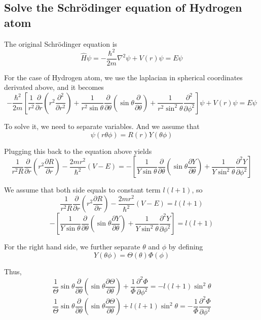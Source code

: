 \documentclass[letterpaper]{article}
\newcommand{\pd}[2]{\frac{\partial #1}{\partial #2}}
\newcommand{\pdd}[2]{\frac{\partial^2 #1}{\partial #2^2}}
\begin{document}
\subsection*{Solve the Schrödinger equation of Hydrogen atom}
The original Schrödinger equation is
\begin{equation*}
    \hat{H}\psi=-\frac{\hbar^2}{2m}\nabla^2\psi+V(r)\psi=E\psi
\end{equation*}

For the case of Hydrogen atom, we use the laplacian in spherical coordinates derivated
above, and it becomes
\begin{equation*}
    -\frac{\hbar^2}{2m}\left[\frac{1}{r^2}\pd{}{r}\left(r^2\pdd{}{r}\right)+
        \frac{1}{r^2\sin\theta}\pd{}{\theta}\left(\sin\theta\pd{}{\theta}\right)+
        \frac{1}{r^2\sin^2\theta}\pdd{}{\phi}\right]\psi+V(r)\psi=E\psi
\end{equation*}

To solve it, we need to separate variables. And we assume that
\begin{equation*}
    \psi(r\theta\phi)=R(r)Y(\theta\phi)
\end{equation*}

Plugging this back to the equation above yields
\begin{equation*}
    \frac{1}{r^2R}\pd{}{r}\left(r^2\pd{R}{r}\right)-\frac{2mr^2}{\hbar^2}(V-E)=
    -\left[\frac{1}{Y\sin\theta}\pd{}{\theta}\left(\sin\theta\pd{Y}{\theta}\right)+
        \frac{1}{Y\sin^2\theta}\pdd{Y}{\phi}\right]
\end{equation*}

We assume that both side equals to constant term $l(l+1)$, so
\begin{equation*}
    \boxed{\frac{1}{r^2R}\pd{}{r}\left(r^2\pd{R}{r}\right)-\frac{2mr^2}{\hbar^2}(V-E)=l(l+1)}
\end{equation*}
\begin{equation*}
    -\left[\frac{1}{Y\sin\theta}\pd{}{\theta}\left(\sin\theta\pd{Y}{\theta}\right)+
        \frac{1}{Y\sin^2\theta}\pdd{Y}{\phi}\right]=l(l+1)
\end{equation*}

For the right hand side, we further separate $\theta$ and $\phi$ by defining
\begin{equation*}
    Y(\theta\phi)=\Theta(\theta)\Phi(\phi)
\end{equation*}

Thus,
\begin{equation*}
    \frac{1}{\Theta}\sin\theta\pd{}{\theta}\left(\sin\theta\pd{\Theta}{\theta}\right)+
    \frac{1}{\Phi}\pdd{\Phi}{\phi}=-l(l+1)\sin^2\theta
\end{equation*}
\begin{equation*}
    \frac{1}{\Theta}\sin\theta\pd{}{\theta}\left(\sin\theta\pd{\Theta}{\theta}\right)+
    l(l+1)\sin^2\theta=-\frac{1}{\Phi}\pdd{\Phi}{\phi}
\end{equation*}
\end{document}
